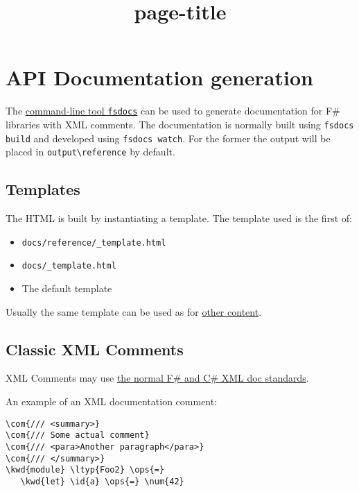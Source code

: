 \documentclass{article}
\title{{page-title}}
\date{}
\newcommand{\id}[1]{\textcolor{black}{#1}}
\newcommand{\com}[1]{\textcolor{officegreen}{#1}}
\newcommand{\kwd}[1]{\textcolor{navy}{#1}}
\newcommand{\num}[1]{\textcolor{officegreen}{#1}}
\newcommand{\ops}[1]{\textcolor{purple}{#1}}
\begin{document}
\maketitle

\section*{API Documentation generation}



The \href{commandline.html}{command-line tool \texttt{fsdocs}} can be used to generate documentation
for F\# libraries with XML comments.  The documentation is normally built using \texttt{fsdocs build} and developed using \texttt{fsdocs watch}. For
the former the output will be placed in \texttt{output{\textbackslash}reference} by default.
\subsection*{Templates}



The HTML is built by instantiating a template. The template used is the first of:
\begin{itemize}
\item 

\texttt{docs/reference/\_template.html}

\item 

\texttt{docs/\_template.html}

\item 

The default template

\end{itemize}



Usually the same template can be used as for \href{content.html}{other content}.
\subsection*{Classic XML Comments}



XML Comments may use \href{https://docs.microsoft.com/en-us/dotnet/csharp/programming-guide/xmldoc/}{the normal F\# and C\# XML doc standards}.


An example of an XML documentation comment:
\begin{Verbatim}[commandchars=\\\{\}]
\com{/// <summary>}
\com{/// Some actual comment}
\com{/// <para>Another paragraph</para>}
\com{/// </summary>}
\kwd{module} \ltyp{Foo2} \ops{=} 
   \kwd{let} \id{a} \ops{=} \num{42}
\end{Verbatim}
\end{document}
